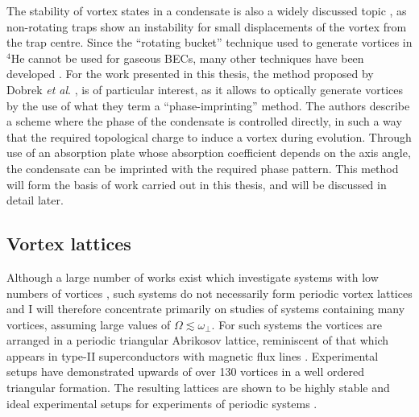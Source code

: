 The stability of vortex states in a condensate is also a widely discussed topic \cite{Vtx:Fedichev_pra_1999,Vtx:Feder_prl_1999}, as non-rotating traps show an instability for small displacements of the vortex from the trap centre. Since the ``rotating bucket'' technique used to generate vortices in $^4$He cannot be used for gaseous BECs, many other techniques have been developed \cite{Vtx:Anglin_prl_1999,Vtx:Davies_prl_1999,Vtx:Marshall_pra_1999,Vtx:Dobrek_pra_1999,Vtx:Nakahara_physb_200}. For the work presented in this thesis, the method proposed by Dobrek \textit{et al}. \cite{Vtx:Dobrek_pra_1999}, is of particular interest, as it allows to optically generate vortices by the use of what they term a ``phase-imprinting'' method. The authors describe a scheme where the phase of the condensate is controlled directly, in such a way that the required topological charge to induce a vortex during evolution. Through use of an absorption plate whose absorption coefficient depends on the axis angle, the condensate can be imprinted with the required phase pattern. This method will form the basis of work carried out in this thesis, and will be discussed in detail later.


\subsection{Vortex lattices}\label{sec:sec2_vtxlatt}

Although a large number of works exist which investigate systems with low numbers of vortices \cite{THS:Davies_2000,Vtx:Chevy_prl_2000,Vtx:Cooper_prl_2001,Vtx:Rosenbusch_prl_2002,Vtx:Ogawa_pra_2002,Vtx:Bretin_joptb_2003,Vtx:Madison_prl_2000,Vtx:Madison_jmo_2000,Vtx:Chevy_aoi_2001,Vtx:Madison_prl_2001,Vtx:Mottonen_jpcm_2002}, such systems do not necessarily form periodic vortex lattices and I will therefore concentrate primarily on studies of systems containing many vortices, assuming large values of $\Omega \lesssim \omega_\perp$. For such systems the vortices are arranged in a periodic triangular Abrikosov lattice, reminiscent of that which appears in type-II superconductors with magnetic flux lines \cite{Vtx:AboShaeer_sci_2001}. Experimental setups have demonstrated upwards of over 130 vortices in a well ordered triangular formation. The resulting lattices are shown to be highly stable and ideal experimental setups for experiments of periodic systems \cite{Vtx:AboShaeer_sci_2001,Vtx:Engels_prl_2002}.

